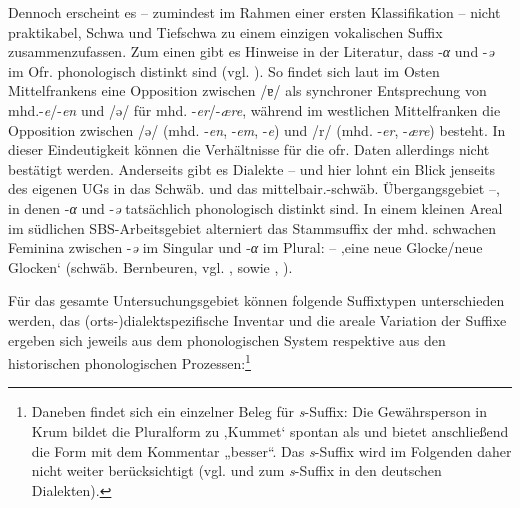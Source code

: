 Dennoch erscheint es -- zumindest im Rahmen einer ersten Klassifikation -- nicht praktikabel, Schwa und Tiefschwa zu einem einzigen vokalischen Suffix zusammenzufassen. Zum einen gibt es Hinweise in der Literatur, dass -\textit{α} und -\textit{ə} im Ofr. phonologisch distinkt sind (vgl. \citealt[82]{Rowley1997}). So findet sich laut \citet[214--215]{Diegritz1971} im Osten Mittelfrankens eine Opposition zwischen /ɐ/ als synchroner Entsprechung von mhd.-\textit{e}/-\textit{en} und /ə/ für mhd. -\textit{er}/-\textit{ære}, während im westlichen Mittelfranken die Opposition zwischen /ə/ (mhd. -\textit{en}, -\textit{em}, -\textit{e}) und /r/ (mhd. -\textit{er}, {}-\textit{ære}) besteht. In dieser Eindeutigkeit können die Verhältnisse für die ofr. Daten allerdings nicht bestätigt werden. Anderseits gibt es Dialekte -- und hier lohnt ein Blick jenseits des eigenen UGs in das Schwäb. und das mittelbair.-schwäb. Übergangsgebiet --, in denen -\textit{α} und -\textit{ə} tatsächlich phonologisch distinkt sind. In einem kleinen Areal im südlichen SBS-Arbeitsgebiet alterniert das Stammsuffix der mhd. schwachen Feminina zwischen -\textit{ə} im Singular und -\textit{α} im Plural:    --   ‚eine neue Glocke/neue Glocken‘ (schwäb. Bernbeuren, vgl. ,  sowie \citealt[Karten 105--117]{SBS9.1}, \citealt[8]{Rowley1994}).

\begin{sloppypar}
Für das gesamte Untersuchungsgebiet können folgende Suffixtypen unterschieden werden, das (orts-)dialektspezifische Inventar und die areale Variation der Suffixe ergeben sich jeweils aus dem phonologischen System respektive aus den historischen phonologischen Prozessen:\footnote{Daneben findet sich ein einzelner Beleg für \textit{s}{}-Suffix: Die Gewährsperson in Krum bildet die Pluralform zu ‚Kummet‘ spontan als  und bietet anschließend die Form  mit dem Kommentar „besser“. Das \textit{s}-Suffix wird im Folgenden daher nicht weiter berücksichtigt (vgl.  und \citealt[1199]{Dingeldein1983} zum \textit{s}-Suffix in den deutschen Dialekten).} 
\end{sloppypar}

